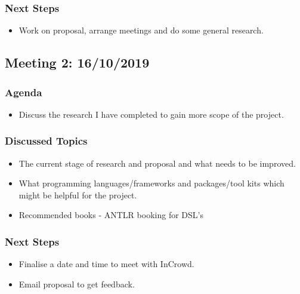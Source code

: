 \begin{appendices}
\subsubsection{Next Steps}

\begin{itemize}

 \item Work on proposal, arrange meetings and do some general research.
\end{itemize}

\subsection{Meeting 2: 16/10/2019}

\subsubsection{Agenda}

\begin{itemize}

 \item Discuss the research I have completed to gain more scope of the project.
\end{itemize}

\subsubsection{Discussed Topics}

\begin{itemize}

 \item The current stage of research and proposal and what needs to be improved.
 \item What programming languages/frameworks and packages/tool kits which might be helpful for the project.
 \item Recommended books - ANTLR booking for DSL's
\end{itemize}

\subsubsection{Next Steps}

\begin{itemize}

 \item Finalise a date and time to meet with InCrowd.
 \item Email proposal to get feedback.
\end{itemize}



\end{appendices}
